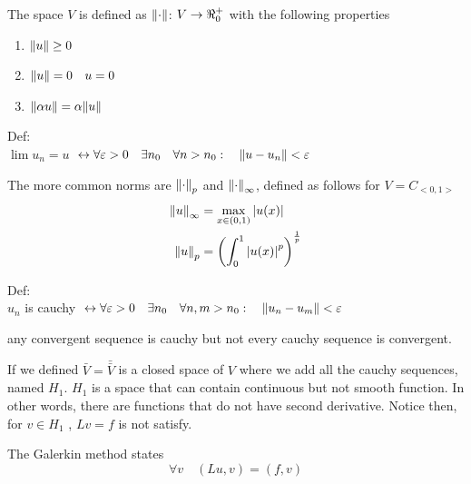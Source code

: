 The space $V$ is defined as  $\norm{\cdot}$: $V \rightarrow  \real_0^+$ with the following properties

\begin{enumerate}
	\item  $\norm{u} \geq 0$
	\item  $\norm{u} = 0  \quad u=0$
	\item  $ \norm{\alpha u} = \alpha \norm{u}$
\end{enumerate}

Def: \\
$\lim u_{n} = u$ $\leftrightarrow \forall \varepsilon > 0 \quad  \exists n_0 \quad \forall n >n_0 : \quad \norm{u-u_n} < \varepsilon$

 \begin{center}
\end{center} 

The more common norms are $\norm{\cdot}_p$ and $\norm{\cdot}_\infty$, defined as follows for $V= C_{<0,1>}$
\begin{equation}
	\begin{split}
		\norm{u}_\infty & =   \max_{x\in(0,1)}\abs{u(x)} \\
		\norm{u}_p & = \left( \int_{0}^{1} \abs{u(x)}^p\right)^{\frac{1}{p}}
	\end{split}
\end{equation}

Def: \\
$u_n$ is cauchy $\leftrightarrow \forall \varepsilon > 0 \quad  \exists n_0 \quad \forall n,m >n_0 : \quad \norm{u_n-u_m} < \varepsilon$

any convergent sequence is cauchy but not every cauchy sequence is convergent. 

If we defined $\bar{V} = \bar{\bar{V}}$ is a closed space of $V$ where we add all the cauchy sequences, named $H_1$. $H_1$ is a space that can contain continuous but not smooth function. In other words, there are functions that do not have second derivative.  Notice then, for  $v \in H_1$ , $Lv = f $ is not satisfy. 

The Galerkin method states 
\begin{equation}
	\forall v \quad (Lu,v) = (f,v)
\end{equation}

